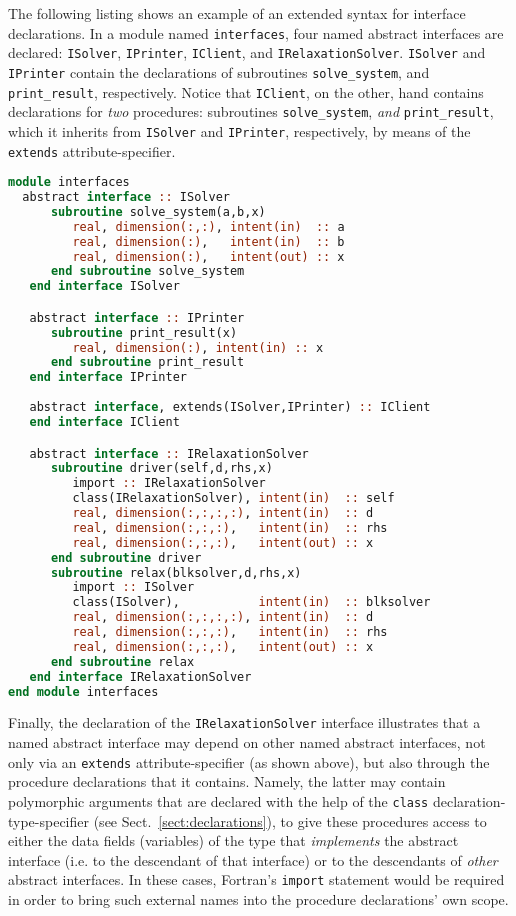 \documentclass[11pt,oneside]{article}
\begin{document}
The following listing shows an example of an extended syntax for
interface declarations. In a module named \texttt{interfaces}, four
named abstract interfaces are declared: \texttt{ISolver},
\texttt{IPrinter}, \texttt{IClient}, and
\texttt{IRelaxationSolver}. \texttt{ISolver} and \texttt{IPrinter}
contain the declarations of subroutines \texttt{solve\_system}, and
\texttt{print\_result}, respectively. Notice that \texttt{IClient}, on
the other, hand contains declarations for \emph{two} procedures:
subroutines \texttt{solve\_system}, \emph{and} \texttt{print\_result},
which it inherits from \texttt{ISolver} and \texttt{IPrinter},
respectively, by means of the \texttt{extends} attribute-specifier.

\begin{lstlisting}[language=Fortran]
module interfaces
  abstract interface :: ISolver
      subroutine solve_system(a,b,x)
         real, dimension(:,:), intent(in)  :: a
         real, dimension(:),   intent(in)  :: b
         real, dimension(:),   intent(out) :: x
      end subroutine solve_system
   end interface ISolver

   abstract interface :: IPrinter
      subroutine print_result(x)
         real, dimension(:), intent(in) :: x
      end subroutine print_result
   end interface IPrinter
   
   abstract interface, extends(ISolver,IPrinter) :: IClient
   end interface IClient

   abstract interface :: IRelaxationSolver
      subroutine driver(self,d,rhs,x)
         import :: IRelaxationSolver
         class(IRelaxationSolver), intent(in)  :: self
         real, dimension(:,:,:,:), intent(in)  :: d
         real, dimension(:,:,:),   intent(in)  :: rhs
         real, dimension(:,:,:),   intent(out) :: x
      end subroutine driver
      subroutine relax(blksolver,d,rhs,x)
         import :: ISolver
         class(ISolver),           intent(in)  :: blksolver
         real, dimension(:,:,:,:), intent(in)  :: d
         real, dimension(:,:,:),   intent(in)  :: rhs
         real, dimension(:,:,:),   intent(out) :: x
      end subroutine relax
   end interface IRelaxationSolver
end module interfaces
\end{lstlisting}
\label{list:interface}
Finally, the declaration of the \texttt{IRelaxationSolver} interface
illustrates that a named abstract interface may depend on other named
abstract interfaces, not only via an \texttt{extends}
attribute-specifier (as shown above), but also through the procedure
declarations that it contains. Namely, the latter may contain
polymorphic arguments that are declared with the help of the
\texttt{class} declaration-type-specifier (see
Sect.~\ref{sect:declarations}), to give these procedures access to
either the data fields (variables) of the type that \emph{implements}
the abstract interface (i.e. to the descendant of that interface) or
to the descendants of \emph{other} abstract interfaces. In these
cases, Fortran's \texttt{import} statement would be required in order
to bring such external names into the procedure declarations' own
scope.
\end{document}
